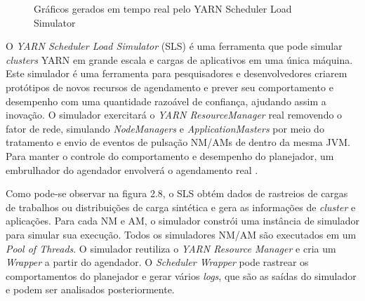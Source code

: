\begin{figure}[htbp]
    \hfill
    
    \caption{Gráficos gerados em tempo real pelo YARN Scheduler Load Simulator}
    \cite{ApacheSLS}
\end{figure}

O \emph{YARN Scheduler Load Simulator} (SLS) é uma ferramenta que pode simular \emph{clusters} YARN em grande escala e cargas de aplicativos em uma única máquina. Este simulador é uma ferramenta para pesquisadores e desenvolvedores criarem protótipos de novos recursos de agendamento e prever seu comportamento e desempenho com uma quantidade razoável de confiança, ajudando assim a inovação. O simulador exercitará o \emph{YARN ResourceManager} real removendo o fator de rede, simulando \emph{NodeManagers} e \emph{ApplicationMasters} por meio do tratamento e envio de eventos de pulsação NM/AMs de dentro da mesma JVM. Para manter o controle do comportamento e desempenho do planejador, um embrulhador do agendador envolverá o agendamento real \cite{ApacheSLS}.



Como pode-se observar na figura 2.8, o SLS obtém dados de rastreios de cargas de trabalhos ou distribuições de carga sintética e gera as informações de \emph{cluster} e aplicações. Para cada NM e AM, o simulador constrói uma instância de simulador para simular sua execução. Todos os simuladores NM/AM são executados em um \emph{Pool of Threads}. O simulador reutiliza o \emph{YARN Resource Manager} e cria um \emph{Wrapper} a partir do agendador. O \emph{Scheduler Wrapper} pode rastrear os comportamentos do planejador e gerar vários \emph{logs}, que são as saídas do simulador e podem ser analisados posteriormente.

